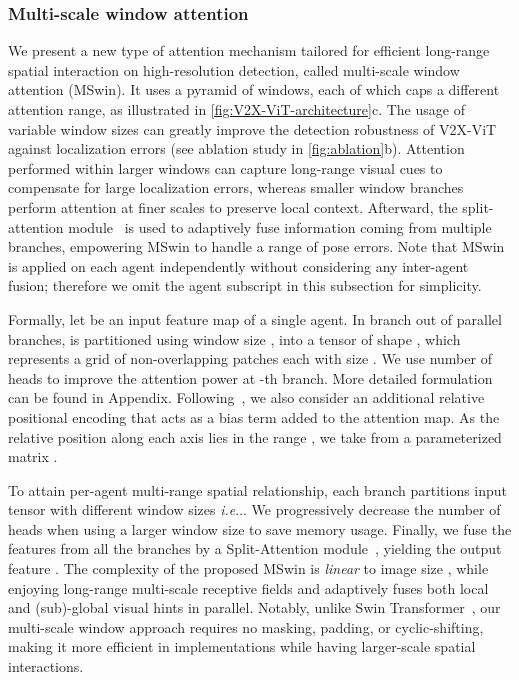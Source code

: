 \documentclass[runningheads]{llncs}
\makeatletter
\DeclareRobustCommand\onedot{\futurelet\@let@token\@onedot}
\def\@onedot{\ifx\@let@token.\else.\null\fi\xspace}
\def\ie{\emph{i.e}\onedot} \def\Ie{\emph{I.e}\onedot}
\makeatother
\begin{document}
\subsubsection{Multi-scale window attention}
\label{sssec:mswin}
We present a new type of attention mechanism tailored for efficient long-range spatial interaction on high-resolution detection, called multi-scale window attention (MSwin). It uses a pyramid of windows, each of which caps a different attention range, as illustrated in \cref{fig:V2X-ViT-architecture}c. The usage of variable window sizes can greatly improve the detection robustness of V2X-ViT against localization errors (see ablation study in \cref{fig:ablation}b). Attention performed within larger windows can capture long-range visual cues to compensate for large localization errors, whereas smaller window branches perform attention at finer scales to preserve local context. Afterward, the split-attention module~\cite{zhang2020resnest} is used to adaptively fuse information coming from multiple branches, empowering MSwin to handle a range of pose errors. Note that MSwin is applied on each agent independently without considering any inter-agent fusion; therefore we omit the agent subscript in this subsection for simplicity.

Formally, let  be an input feature map of a single agent. In branch  out of  parallel branches,  is partitioned using window size , into a tensor of shape , which represents a  grid of non-overlapping patches each with size . We use  number of heads to improve the attention power at -th branch. More detailed formulation can be found in Appendix.
Following~\cite{liu2021swin,hu2019local}, we also consider an additional relative positional encoding  that acts as a bias term added to the attention map. As the relative position along each axis lies in the range ,  we take  from a parameterized matrix .

To attain per-agent multi-range spatial relationship, each branch partitions input tensor  with different window sizes \ie . 
We progressively decrease the number of heads when using a larger window size to save memory usage. Finally, we fuse the features from all the branches by a Split-Attention module~\cite{zhang2020resnest}, yielding the output feature .
The complexity of the proposed MSwin is \textit{linear} to image size , while enjoying long-range multi-scale receptive fields and adaptively fuses both local and (sub)-global visual hints in parallel. Notably, unlike Swin Transformer~\cite{liu2021swin}, our multi-scale window approach requires no masking, padding, or cyclic-shifting, making it more efficient in implementations while having larger-scale spatial interactions.
\end{document}

